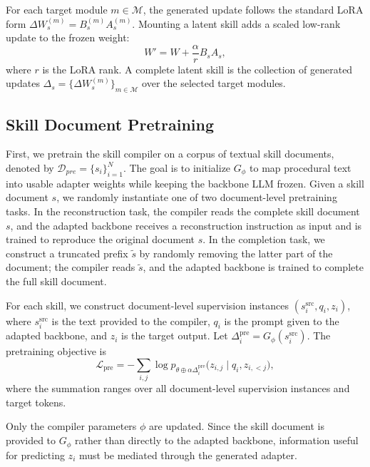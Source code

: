 For each target module $m \in \mathcal{M}$, the generated update follows the standard LoRA form $\Delta W_s^{(m)}=B_s^{(m)}A_s^{(m)}$. Mounting a latent skill adds a scaled low-rank update to the frozen weight:
\begin{equation}
    W'
    =
    W
    +
    \frac{\alpha}{r} B_s A_s ,
\end{equation}
where $r$ is the LoRA rank. A complete latent skill is the collection of generated updates $\Delta_s=\{\Delta W_s^{(m)}\}_{m\in\mathcal{M}}$ over the selected target modules. 

\subsection{Skill Document Pretraining}
\label{sec:pretraining}

First, we pretrain the skill compiler on a corpus
of textual skill documents, denoted by \(\mathcal{D}_{pre} =
\{s_i\}_{i=1}^N\). The goal is to initialize \(G_\phi\) to map procedural text into usable adapter weights while keeping the backbone LLM frozen.
Given a skill document \(s\), we randomly instantiate one of two document-level pretraining tasks. In the reconstruction task, the compiler reads the complete skill document \(s\), and the adapted backbone receives a reconstruction instruction as input and is trained to reproduce the original document \(s\). In the completion task, we construct a truncated prefix \(\tilde{s}\) by randomly removing the latter part of the document; the compiler reads \(\tilde{s}\), and the adapted backbone is trained to complete the full skill document.

For each skill, we construct document-level supervision instances $(s_i^{\mathrm{src}}, q_i, z_i)$, where $s_i^{\mathrm{src}}$ is the text provided to the compiler, $q_i$ is the prompt given to the adapted backbone, and $z_i$ is the target output. Let $\Delta_i^{\mathrm{pre}}=G_\phi(s_i^{\mathrm{src}})$. The pretraining objective is
\begin{equation}
    \mathcal{L}_{\mathrm{pre}}
    =
    -\sum_{i,j}
    \log p_{\theta \oplus \alpha \Delta_i^{\mathrm{pre}}}
    \bigl(z_{i,j} \mid q_i, z_{i,<j}\bigr),
\end{equation}
where the summation ranges over all document-level supervision instances and target tokens.

Only the compiler parameters $\phi$ are updated. Since the skill document is provided to $G_\phi$ rather than directly to the adapted backbone, information useful for predicting $z_i$ must be mediated through the generated adapter.

